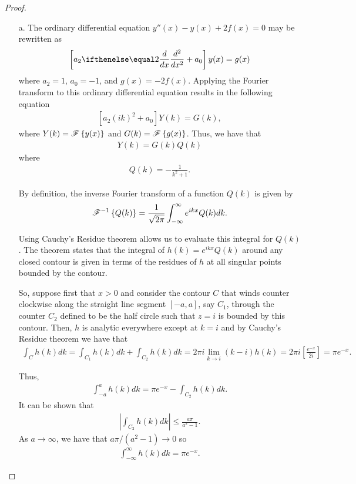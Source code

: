 \begin{proof}
  \begin{enumerate}
    \item[a.] The ordinary differential equation $y''(x) - y(x) + 2f(x) = 0$ may be rewritten
      as
      \begin{align*}
        \left[a_2 \der{x}{2} + a_0\right] y(x) = g(x)
      \end{align*}
      where $a_2 = 1$, $a_0 = -1$, and $g(x) = -2f(x)$. Applying the Fourier transform
      to this ordinary differential equation results in the following equation
      \begin{align*}
        \left[a_2(ik)^2 + a_0\right]Y(k) = G(k),
      \end{align*}
      where $Y(k) = \mathscr{F}\left\{ {y(x)} \right\}$ and $G(k) = \mathscr{F}\left\{ {g(x)} \right\}$. Thus, we have that
      \begin{align*}
        Y(k) = G(k)Q(k)
      \end{align*}
      where
      \begin{align*}
        Q(k) = -\frac{1}{k^2+1}.
      \end{align*}

      By definition, the inverse Fourier transform of a function $Q(k)$ is given by
      \begin{align*}
        \mathscr{F}^{-1}\left\{ {Q(k)} \right\} = \frac{1}{\sqrt{2\pi}} \int_{-\infty}^{\infty} e^{i k x} Q(k) dk.
      \end{align*}

      Using Cauchy's Residue theorem allows us to evaluate this integral for $Q(k)$. The theorem
      states that the integral of $h(k) = e^{i k x} Q(k)$ around any closed contour
      is given in terms of the residues of $h$ at all singular points bounded by the contour.

      So, suppose first that $x > 0$ and consider the contour $C$ that winds counter clockwise along the straight line segment $[-a, a]$, say $C_1$,
      through the counter $C_2$ defined to be the half circle such that $z = i$ is bounded by this contour. Then,
      $h$ is analytic everywhere except at $k=i$ and by Cauchy's Residue theorem we have that
      \begin{align*}
        \int_C h(k) dk = \int_{C_1} h(k) dk + \int_{C_2} h(k) dk
        = 2\pi i\lim_{k\to i} (k-i)h(k)
        = 2\pi i\left[\frac{e^{-x}}{2i}\right]
        = \pi e^{-x}.
      \end{align*}

      Thus,
      \begin{align*}
        \int_{-a}^{a} h(k) dk = \pi e^{-x} - \int_{C_2} h(k) dk.
      \end{align*}
      It can be shown that
      \begin{align*}
        \left| \int_{C_2} h(k) dk \right| \leq \frac{a \pi}{a^2 -1}.
      \end{align*}
      As $a\to \infty$, we have that $a \pi/(a^2 -1) \to 0$ so
      \begin{align*}
        \int_{-\infty}^{\infty} h(k) dk = \pi e^{-x}.
      \end{align*}


\end{enumerate}
\end{proof}
